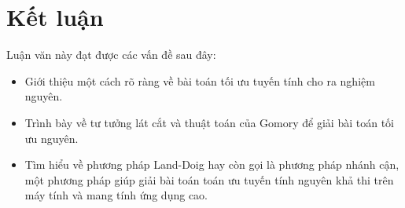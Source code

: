 \documentclass[12pt,a4paper]{report}
\begin{document}
\chapter*{Kết luận}                         %
\indent
\thispagestyle{fancy}

Luận văn này đạt được các vấn đề sau đây:

\begin{itemize}
    \item Giới thiệu một cách rõ ràng về bài toán tối ưu tuyến tính cho ra nghiệm nguyên.
    \item Trình bày về tư tưởng lát cắt và thuật toán của Gomory để giải bài toán tối ưu nguyên.
	\item Tìm hiểu về phương pháp Land-Doig hay còn gọi là phương pháp nhánh cận, một phương pháp giúp giải bài toán toán ưu tuyến tính nguyên khả thi trên máy tính và mang tính ứng dụng cao.
\end{itemize}
\nocite{*}


\end{document}
